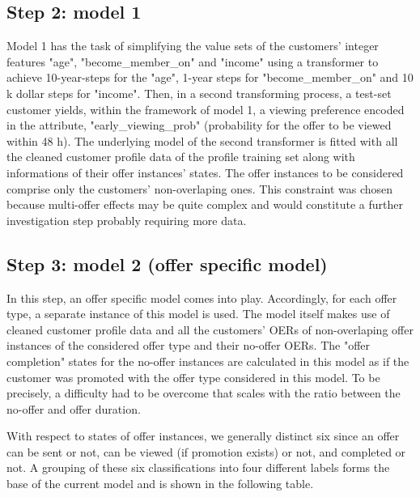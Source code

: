 \documentclass[11pt]{article} %
\begin{document}
\subsection{Step 2: model 1}
Model 1 has the task of simplifying the value sets of the customers' integer features "age", "become\_member\_on" and "income" using a transformer to achieve 10-year-steps for the "age", 1-year steps for "become\_member\_on" and 10 k dollar steps for "income".
Then, in a second transforming process,  a test-set customer yields, within the framework of model 1, a viewing preference encoded in the attribute, "early\_viewing\_prob" (probability for the offer to be viewed within 48 h).
The underlying model of the second transformer is fitted with all the cleaned customer profile data of the profile training set along with informations of their offer instances' states. The offer instances to be considered comprise only the customers' non-overlaping  ones. This constraint was chosen because multi-offer effects may be quite complex and would constitute a further investigation step probably requiring more data.



\subsection{Step 3: model 2 (offer specific model)}

In this step, an offer specific model comes into play. Accordingly, for each offer type, a separate instance of this model is used.
The model itself makes use of cleaned customer profile data and all the customers' OERs of non-overlaping offer instances of the considered offer type and their no-offer OERs.
The "offer completion" states for the no-offer instances are calculated in this model as if the customer was promoted with the offer type considered in this model.
To be precisely, a difficulty had to be overcome that scales with the ratio between the no-offer and offer duration.

With respect to states of offer instances, we generally distinct six since an offer can be  sent or not, can be viewed (if promotion exists) or not, and completed or not.
A grouping of these six classifications into four different labels forms the base of the current model and is shown in the following table.
\end{document}
